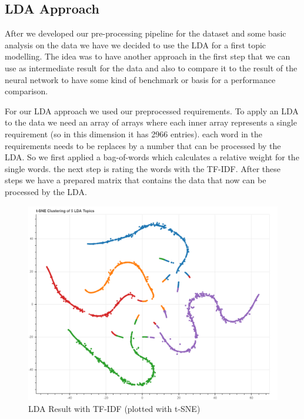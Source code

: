 \subsection{LDA Approach} %
\label{sub:own_lda}
After we developed our pre-processing pipeline for the dataset and some basic analysis on the data we have we decided to use the LDA for a first topic modelling. The idea was to have another approach in the first step that we can use as intermediate result for the data and also to compare it to the result of the neural network to have some kind of benchmark or basis for a performance comparison.


For our LDA approach we used our preprocessed requirements. To apply an LDA to the data we need an array of arrays where each inner array represents a single requirement (so in this dimension it has 2966 entries). each word in the requirements needs to be replaces by a number that can be processed by the LDA. So we first applied a bag-of-words which calculates a relative weight for the single words. the next step is rating the words with the TF-IDF. After these steps we have a prepared matrix that contains the data that now can be processed by the LDA.

\begin{figure}[h]
  \begin{center}
    \includegraphics[width=\textwidth]{screenshots/lda-tf-idf.png}
    \caption{LDA Result with TF-IDF (plotted with t-SNE)}
    \label{fig:lda-tf-idf}
  \end{center}
\end{figure}

